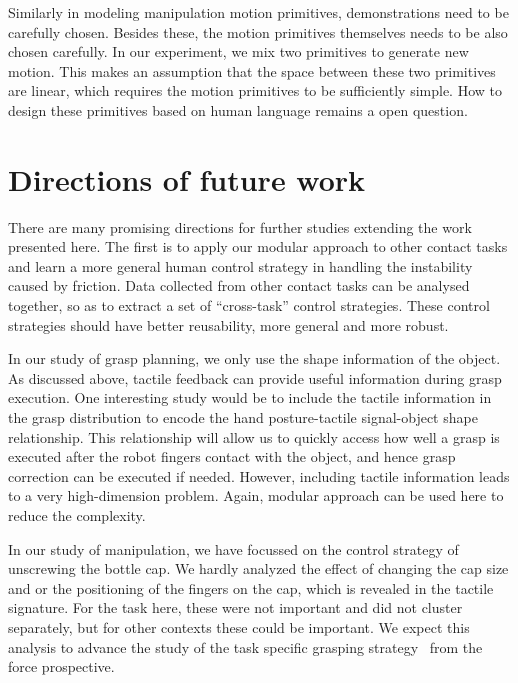 Similarly in modeling manipulation motion primitives, demonstrations need to be carefully chosen. Besides these, the motion primitives themselves needs to be also chosen carefully.
In our experiment, we mix two primitives to generate new motion. This makes an assumption that the space between these two primitives are linear, which requires the motion primitives to be sufficiently simple. How to design these primitives based on human language remains a open question.







\section{Directions of future work}
\label{cha6:sec3}

There are many promising directions for further studies extending the
work presented here. The first is to apply our modular approach to other
contact tasks and learn a more general human control strategy in
handling the instability caused by friction. Data collected from other contact tasks can be analysed together, so as to extract a set of ``cross-task'' control strategies. These control strategies should have better reusability, more general and more robust.

In our study of grasp planning, we only use the shape information of the object. As discussed above, tactile feedback can provide useful information during grasp execution. One interesting study would be to include the tactile information in the grasp distribution to encode the hand posture-tactile signal-object shape relationship. This relationship will allow us to quickly access how well a grasp is executed after the robot fingers contact with the object, and hence grasp correction can be executed if needed. However, including tactile information leads to a very high-dimension problem. Again, modular approach can be used here to reduce the complexity.

In our study of manipulation, we have focussed on the control strategy of unscrewing
the bottle cap. We hardly analyzed the effect of changing the cap size and or
the positioning of the fingers on the cap, which is revealed in the
tactile signature. For the task here, these were not important and
did not cluster separately, but for other contexts these could be
important. We expect this analysis to advance the study of the task specific grasping
strategy~\citep{el2013generation,dang2014semantic} from the force prospective.

